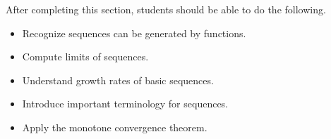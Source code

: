 \documentclass{ximera}
\begin{document}
\begin{sectionOutcomes}

After completing this section, students should be able to do the following.

\begin{itemize}
\item{Recognize sequences can be generated by functions.}
\item{Compute limits of sequences.}
\item{Understand growth rates of basic sequences.}
\item{Introduce important terminology for sequences.}
\item{Apply the monotone convergence theorem.}
\end{itemize}

\end{sectionOutcomes}
\end{document}
